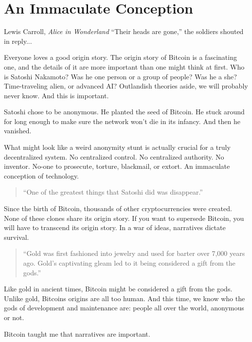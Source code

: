 \chapter{ An Immaculate Conception}
\label{les:5}

\begin{chapquote}{Lewis Carroll, \textit{Alice in Wonderland}}
``Their heads are gone,'' the soldiers shouted in reply...
\end{chapquote}

Everyone loves a good origin story. The origin story of Bitcoin is a
fascinating one, and the details of it are more important than one might
think at first. Who is Satoshi Nakamoto? Was he one person or a group of
people? Was he a she? Time-traveling alien, or advanced AI? Outlandish
theories aside, we will probably never know. And this is important.

Satoshi chose to be anonymous. He planted the seed of Bitcoin. He stuck
around for long enough to make sure the network won't die in its
infancy. And then he vanished.

What might look like a weird anonymity stunt is actually crucial for a
truly decentralized system. No centralized control. No centralized
authority. No inventor. No-one to prosecute, torture, blackmail, or
extort. An immaculate conception of technology.

\begin{quotation}
``One of the greatest things that Satoshi did was disappear.''
\end{quotation}

Since the birth of Bitcoin, thousands of other cryptocurrencies were
created. None of these clones share its origin story. If you want to
supersede Bitcoin, you will have to transcend its origin story. In a war
of ideas, narratives dictate survival.

\begin{quotation}
``Gold was first fashioned into jewelry and used for barter over 7,000
years ago. Gold's captivating gleam led to it being considered a gift
from the gods.''
\end{quotation}

Like gold in ancient times, Bitcoin might be considered a gift from the
gods. Unlike gold, Bitcoins origins are all too human. And this time, we
know who the gods of development and maintenance are: people all over
the world, anonymous or not.

Bitcoin taught me that narratives are important.

%
%
%
%
